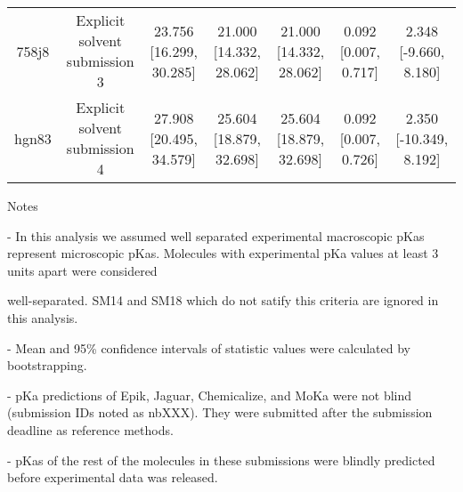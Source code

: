 \documentclass{article}
\begin{document}
\begin{center}
\begin{longtable}{|ccccccc|}
 758j8 &                      Explicit solvent submission 3 &  23.756 [16.299, 30.285] &  21.000 [14.332, 28.062] &  21.000 [14.332, 28.062] &  0.092 [0.007, 0.717] &   2.348 [-9.660, 8.180] \\
 hgn83 &                      Explicit solvent submission 4 &  27.908 [20.495, 34.579] &  25.604 [18.879, 32.698] &  25.604 [18.879, 32.698] &  0.092 [0.007, 0.726] &  2.350 [-10.349, 8.192] \\
\end{longtable}
\end{center}

Notes

- In this analysis we assumed well separated experimental macroscopic pKas represent microscopic pKas. Molecules with experimental pKa values at least 3 units apart were considered

well-separated. SM14 and SM18 which do not satify this criteria are ignored in this analysis.

- Mean and 95\% confidence intervals of statistic values were calculated by bootstrapping.

- pKa predictions of Epik, Jaguar, Chemicalize, and MoKa were not blind (submission IDs noted as nbXXX). They were submitted after the submission deadline as reference methods.

- pKas of the rest of the molecules in these submissions were blindly predicted before experimental data was released.
\end{document}
